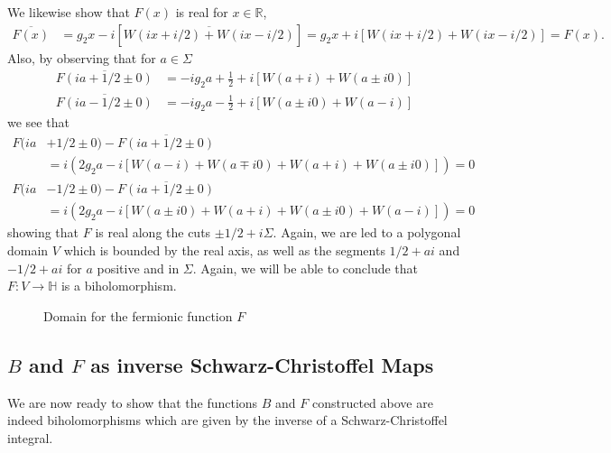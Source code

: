 \documentclass[10pt]{article}
\newcommand{\rr}{\mathbb{R}}
\newcommand{\hh}{\mathbb{H}}
\newcommand{\re}[1]{\text{Re}(#1)}
\theoremstyle{plain}
\theoremstyle{definition}
\theoremstyle{plain}
\begin{document}
We likewise show that $F(x)$ is real for $x\in \rr$,
\begin{align*}
	\overline{F(x)} &= g_2 x - i [ \overline{W(ix+i/2)+W(ix-i/2)} ]
	= g_2x + i[W(ix+i/2)+W(ix-i/2)] = F(x).
\end{align*}
Also, by observing that for $a\in \Sigma$
\begin{align*}
	\overline{F(ia+1/2\pm 0)} &= -ig_2a + \frac{1}{2} + i[W(a+i)+W(a\pm i0)] \\
	\overline{F(ia-1/2\pm 0)} &= -ig_2a - \frac{1}{2} +i[W(a\pm i0)+W(a-i)]
\end{align*}
we see that
\begin{align*}
	F(ia&+1/2\pm 0)-\overline{F(ia+1/2\pm 0)} \\
	&= i(2g_2a - i [W(a-i)+W(a\mp i0)+W(a+i)+W(a\pm i0)]) = 0 \\
	F(ia&-1/2\pm 0)-\overline{F(ia+1/2\pm 0)} \\
	&= i(2g_2a - i [W(a\pm i0)+W(a+i)+W(a\pm i0)+W(a-i)]) = 0
\end{align*}
showing that $F$ is real along the cuts $\pm1/2 + i\Sigma$. Again, we are led to a polygonal domain $V$ which is bounded by the real axis, as well as the segments $1/2 +ai$ and $-1/2+ai$ for $a$ positive and in $\Sigma$. Again, we will be able to conclude that $F:V\to\hh$ is a biholomorphism. 

\begin{figure}[h]\label{fermionicdomain}
\begin{center}
\end{center}
\caption{Domain for the fermionic function $F$}
\end{figure}

\subsection{$B$ and $F$ as inverse Schwarz-Christoffel Maps}

We are now ready to show that the functions $B$ and $F$ constructed above are indeed biholomorphisms which are given by the inverse of a Schwarz-Christoffel integral. 
\end{document}
